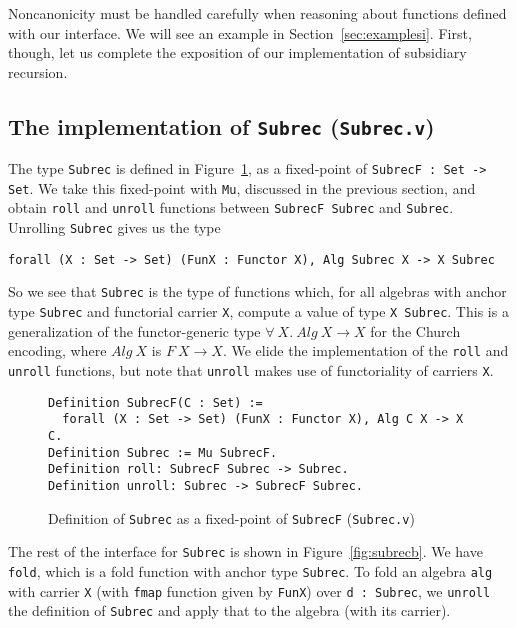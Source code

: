 \documentclass[a4paper,USenglish]{lipics-v2021}
\begin{document}
Noncanonicity must be handled carefully when reasoning about functions
defined with our interface.  We will see an example in
Section~\ref{sec:examplesi}.  First, though, let us complete the
exposition of our implementation of subsidiary recursion.

\subsection{The implementation of \texttt{Subrec} (\texttt{Subrec.v})}
\label{sec:subrecimpl}

The type \verb|Subrec| is defined in Figure~\ref{fig:subrec}, as a
fixed-point of \verb|SubrecF : Set -> Set|.  We take this fixed-point
with \verb|Mu|, discussed in the previous section, and obtain \verb|roll|
and \verb|unroll| functions between \verb|SubrecF Subrec| and \verb|Subrec|.
Unrolling \verb|Subrec| gives us the type
\begin{verbatim}
forall (X : Set -> Set) (FunX : Functor X), Alg Subrec X -> X Subrec
\end{verbatim}
\noindent So we see that \verb|Subrec| is the type of functions which,
for all algebras with anchor type \verb|Subrec| and functorial carrier
\verb|X|, compute a value of type \verb|X Subrec|.  This is a
generalization of the functor-generic type
$\forall\ X.\ \textit{Alg}\ X \to X$ for the Church encoding, where
$\textit{Alg}\ X$ is $F\ X \to X$.  We elide the implementation of the
\verb|roll| and \verb|unroll| functions, but note that \verb|unroll|
makes use of functoriality of carriers \verb|X|.

\begin{figure}
\begin{verbatim}
Definition SubrecF(C : Set) := 
  forall (X : Set -> Set) (FunX : Functor X), Alg C X -> X C.
Definition Subrec := Mu SubrecF.
Definition roll: SubrecF Subrec -> Subrec.
Definition unroll: Subrec -> SubrecF Subrec.
\end{verbatim}
\caption{Definition of \texttt{Subrec} as a fixed-point of \texttt{SubrecF} (\texttt{Subrec.v})}
\label{fig:subrec}
\end{figure}

The rest of the interface for \verb|Subrec| is shown in
Figure~\ref{fig:subrecb}.  We have \verb|fold|, which is a fold
function with anchor type \verb|Subrec|.  To fold an algebra
\verb|alg| with carrier \verb|X| (with \verb|fmap| function given by
\verb|FunX|) over \verb|d : Subrec|, we \verb|unroll| the
definition of \verb|Subrec| and apply that to the algebra (with its
carrier).
\end{document}
